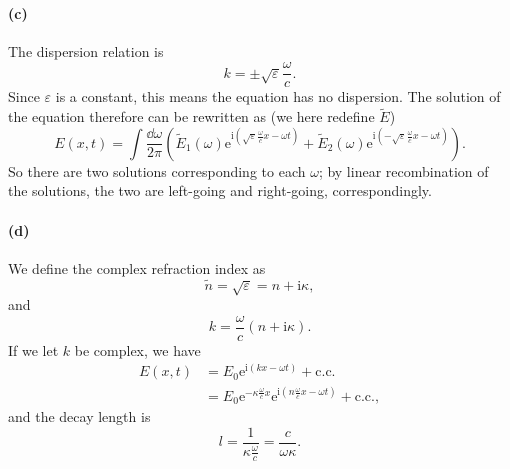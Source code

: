 \documentclass[hyperref, a4paper]{article}
\newcommand*{\ii}{\mathrm{i}}
\newcommand*{\ee}{\mathrm{e}}
\begin{document}
\paragraph{(c)}
The dispersion relation is 
\begin{equation}
    k = \pm \sqrt{\varepsilon} \frac{\omega}{c}.
\end{equation}
Since $\varepsilon$ is a constant, 
this means the equation has no dispersion.
The solution of the equation therefore can be 
rewritten as (we here redefine $\tilde{E}$) 
\begin{equation}
    E(x, t) = \int \frac{\dd{\omega}}{2\pi} \left(
        \tilde{E}_1(\omega) \ee^{\ii \left(
            \sqrt{\varepsilon} \frac{\omega}{c} x - \omega t
        \right)} + 
        \tilde{E}_2(\omega) \ee^{\ii \left(
            - \sqrt{\varepsilon} \frac{\omega}{c} x - \omega t
        \right)}
    \right)  . 
\end{equation}
So there are two solutions corresponding to each $\omega$;
by linear recombination of the solutions, 
the two are left-going and right-going, correspondingly.

\paragraph{(d)} We define the complex refraction index as 
\begin{equation}
    \tilde{n} = \sqrt{\varepsilon} = n + \ii \kappa,
\end{equation}
and 
\begin{equation}
    k = \frac{\omega}{c} (n + \ii \kappa).
\end{equation}
If we let $k$ be complex, we have 
\begin{equation}
    \begin{aligned}
        E(x, t) &= E_0 \ee^{\ii (kx - \omega t)} + \text{c.c.} \\
        &= E_0 \ee^{- \kappa \frac{\omega}{c} x} \ee^{\ii \left(
            n \frac{\omega}{c} x - \omega t
        \right)} + \text{c.c.},
    \end{aligned}
    \label{eq:damping-case-1}
\end{equation} 
and the decay length is 
\begin{equation}
    l = \frac{1}{\kappa \frac{\omega}{c}}
    = \frac{c}{\omega \kappa}  .
    \label{eq:damping-length-1}
\end{equation}
\end{document}
